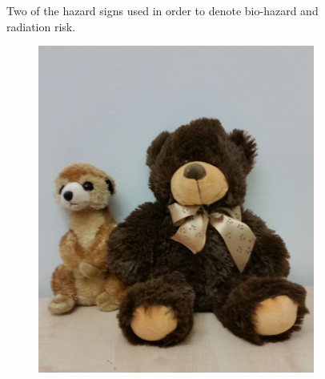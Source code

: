 \documentclass[a4paper,12pt,oneside,openright]{bhamthesis}
\begin{document}
\begin{figure}
\begin{subfigure}[b]{0.41\textwidth}
		\end{subfigure}
		\hfill
		\caption{Two of the hazard signs used in order to denote bio-hazard and radiation risk.}
		\label{fig:hazards_exp3}
	\end{figure}

\begin{figure}
		\centering
		\begin{subfigure}[b]{0.4\textwidth}
			\centering
			\includegraphics[width=\textwidth]{chapter5_fig/victims.jpg}
			\caption{}
			\label{subfig:victims}
		\end{subfigure}
		\hfill
		\begin{subfigure}[b]{0.45\textwidth}
			\centering

\end{subfigure}
\end{figure}
\end{document}
